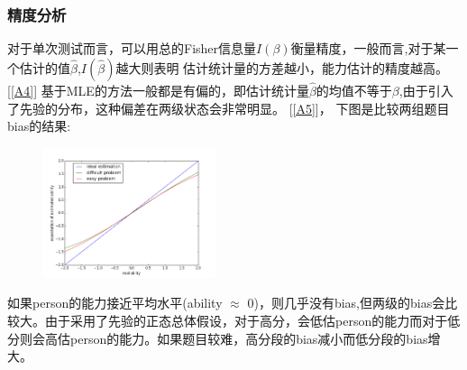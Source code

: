 \documentclass[xetex,mathserif,serif]{beamer}
\begin{document}
   \begin{frame}
    
    \frametitle{精度分析}
对于单次测试而言，可以用总的Fisher信息量$I(\beta)$衡量精度，一般而言,对于某一个估计的值$\hat{\beta}$,$I(\hat{\beta})$越大则表明
估计统计量的方差越小，能力估计的精度越高。[\ref{A4}]
基于MLE的方法一般都是有偏的，即估计统计量$\hat{\beta}$的均值不等于$\beta$,由于引入了先验的分布，这种偏差在两级状态会非常明显。
[\ref{A5}]，
下图是比较两组题目bias的结果:
\begin{figure}[!ht]
\includegraphics[height=1.5in]{bias.png}
\end{figure}
  \end{frame} 
   \begin{frame}
    
    如果person的能力接近平均水平(ability $\approx$ 0)，则几乎没有bias,但两级的bias会比较大。由于采用了先验的正态总体假设，对于高分，会低估person的能力而对于低分则会高估person的能力。如果题目较难，高分段的bias减小而低分段的bias增大。

  \end{frame}
\end{document}
